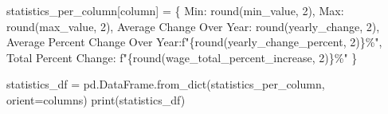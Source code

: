 \documentclass[
  letterpaper,
  DIV=11,
  numbers=noendperiod]{scrartcl}
\newenvironment{Shaded}{\begin{snugshade}}{\end{snugshade}}
\newcommand{\BuiltInTok}[1]{\textcolor[rgb]{0.00,0.23,0.31}{#1}}
\newcommand{\DecValTok}[1]{\textcolor[rgb]{0.68,0.00,0.00}{#1}}
\newcommand{\NormalTok}[1]{\textcolor[rgb]{0.00,0.23,0.31}{#1}}
\newcommand{\OperatorTok}[1]{\textcolor[rgb]{0.37,0.37,0.37}{#1}}
\newcommand{\SpecialCharTok}[1]{\textcolor[rgb]{0.37,0.37,0.37}{#1}}
\newcommand{\SpecialStringTok}[1]{\textcolor[rgb]{0.13,0.47,0.30}{#1}}
\newcommand{\StringTok}[1]{\textcolor[rgb]{0.13,0.47,0.30}{#1}}
\begin{document}
\begin{Shaded}
\begin{Highlighting}[]
\NormalTok{    statistics\_per\_column[column] }\OperatorTok{=}\NormalTok{ \{}
        \StringTok{\textquotesingle{}Min\textquotesingle{}}\NormalTok{: }\BuiltInTok{round}\NormalTok{(min\_value, }\DecValTok{2}\NormalTok{),}
        \StringTok{\textquotesingle{}Max\textquotesingle{}}\NormalTok{: }\BuiltInTok{round}\NormalTok{(max\_value, }\DecValTok{2}\NormalTok{),}
        \StringTok{\textquotesingle{}Average Change Over Year\textquotesingle{}}\NormalTok{: }\BuiltInTok{round}\NormalTok{(yearly\_change, }\DecValTok{2}\NormalTok{),}
        \StringTok{\textquotesingle{}Average Percent Change Over Year\textquotesingle{}}\NormalTok{:}\SpecialStringTok{f"}\SpecialCharTok{\{}\BuiltInTok{round}\NormalTok{(yearly\_change\_percent, }\DecValTok{2}\NormalTok{)}\SpecialCharTok{\}}\SpecialStringTok{\%"}\NormalTok{,}
        \StringTok{\textquotesingle{}Total Percent Change\textquotesingle{}}\NormalTok{: }\SpecialStringTok{f"}\SpecialCharTok{\{}\BuiltInTok{round}\NormalTok{(wage\_total\_percent\_increase, }\DecValTok{2}\NormalTok{)}\SpecialCharTok{\}}\SpecialStringTok{\%"}
\NormalTok{    \}}

\NormalTok{statistics\_df }\OperatorTok{=}\NormalTok{ pd.DataFrame.from\_dict(statistics\_per\_column, orient}\OperatorTok{=}\StringTok{\textquotesingle{}columns\textquotesingle{}}\NormalTok{)}
\BuiltInTok{print}\NormalTok{(statistics\_df)}
\end{Highlighting}
\end{Shaded}
\end{document}
